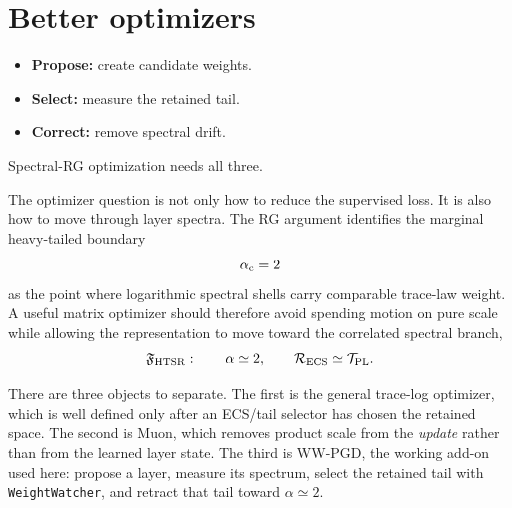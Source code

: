 \documentclass[10pt,twocolumn]{article}
\newcommand{\WW}{\texttt{WeightWatcher}}
\newcommand{\Fhtsr}{\mathfrak F_{\rm HTSR}}
\newcommand{\TPL}{\mathcal T_{\rm PL}}
\newcommand{\RECS}{\mathcal R_{\rm ECS}}
\newcommand{\takeaway}[1]{%
  \par\vspace{4pt}\noindent\textcolor{boxblue}{#1}%
}
\begin{document}

\clearpage
\section{Better optimizers}
\label{sxn:opt}
\begingroup\small
\setlength{\abovedisplayskip}{2pt}
\setlength{\belowdisplayskip}{2pt}
\setlength{\abovedisplayshortskip}{1pt}
\setlength{\belowdisplayshortskip}{1pt}
\setlength{\jot}{1pt}

\begin{tcolorbox}[marginalbox,title=\textbf{13. Optimizers}]
\begin{itemize}
\item \textbf{Propose:} create candidate weights.
\item \textbf{Select:} measure the retained tail.
\item \textbf{Correct:} remove spectral drift.
\end{itemize}
\takeaway{Spectral-RG optimization needs all three.}
\end{tcolorbox}

The optimizer question is not only how to reduce the supervised loss.  It is also how to move through layer spectra.  The RG argument identifies the marginal heavy-tailed boundary
\begin{equation}
        \alpha_{\rm c}=2
\end{equation}
as the point where logarithmic spectral shells carry comparable trace-law weight.  A useful matrix optimizer should therefore avoid spending motion on pure scale while allowing the representation to move toward the correlated spectral branch,
\begin{equation}
        \Fhtsr:
        \qquad
        \alpha\simeq2,
        \qquad
        \RECS\simeq\TPL .
\end{equation}

There are three objects to separate.  The first is the general trace-log optimizer, which is well defined only after an ECS/tail selector has chosen the retained space.  The second is Muon, which removes product scale from the \emph{update} rather than from the learned layer state.  The third is WW-PGD, the working add-on used here: propose a layer, measure its spectrum, select the retained tail with \WW, and retract that tail toward \(\alpha\simeq2\).
\end{document}
